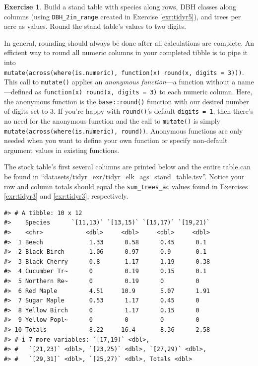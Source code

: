 \documentclass[
  11pt,
]{krantz}
\theoremstyle{definition}
\theoremstyle{definition}
\theoremstyle{definition}
\newtheorem{exercise}{Exercise}[chapter]
\theoremstyle{definition}
\theoremstyle{remark}
\begin{document}
\begin{exercise}
\protect\hypertarget{exr:tidyr6}{}\label{exr:tidyr6}Build a stand table with species along rows, DBH classes along columns (using \texttt{DBH\_2in\_range} created in Exercise \ref{exr:tidyr5}), and trees per acre as values. Round the stand table's values to two digits.

In general, rounding should always be done after all calculations are complete. An efficient way to round all numeric columns in your completed tibble is to pipe it into \texttt{mutate(across(where(is.numeric),\ function(x)\ round(x,\ digits\ =\ 3)))}. This call to \texttt{mutate()} applies an \emph{anonymous function}---a function without a name---defined as \texttt{function(x)\ round(x,\ digits\ =\ 3)} to each numeric column. Here, the anonymous function is the \texttt{base::round()} function with our desired number of digits set to 3. If you're happy with \texttt{round()}'s default \texttt{digits\ =\ 1}, then there's no need for the anonymous function and the call to \texttt{mutate()} is simply \texttt{mutate(across(where(is.numeric),\ round))}. Anonymous functions are only needed when you want to define your own function or specify non-default argument values in existing functions.

The stock table's first several columns are printed below and the entire table can be found in ``datasets/tidyr\_exr/tidyr\_elk\_ags\_stand\_table.tsv''. Notice your row and column totals should equal the \texttt{sum\_trees\_ac} values found in Exercises \ref{exr:tidyr3} and \ref{exr:tidyr3}, respectively.
\end{exercise}

\begin{verbatim}
#> # A tibble: 10 x 12
#>    Species      `[11,13)` `[13,15)` `[15,17)` `[19,21)`
#>    <chr>            <dbl>     <dbl>     <dbl>     <dbl>
#>  1 Beech             1.33      0.58      0.45      0.1 
#>  2 Black Birch       1.06      0.97      0.9       0.1 
#>  3 Black Cherry      0.8       1.17      1.19      0.38
#>  4 Cucumber Tr~      0         0.19      0.15      0.1 
#>  5 Northern Re~      0         0.19      0         0   
#>  6 Red Maple         4.51     10.9       5.07      1.91
#>  7 Sugar Maple       0.53      1.17      0.45      0   
#>  8 Yellow Birch      0         1.17      0.15      0   
#>  9 Yellow Popl~      0         0         0         0   
#> 10 Totals            8.22     16.4       8.36      2.58
#> # i 7 more variables: `[17,19)` <dbl>,
#> #   `[21,23)` <dbl>, `[23,25)` <dbl>, `[27,29)` <dbl>,
#> #   `[29,31]` <dbl>, `[25,27)` <dbl>, Totals <dbl>
\end{verbatim}
\end{document}
